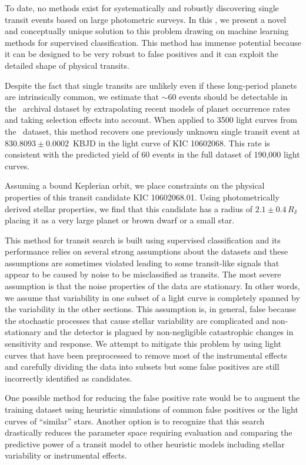 To date, no methods exist for systematically and robustly discovering single
transit events based on large photometric surveys.
In this \paper, we present a novel and conceptually unique solution to this
problem drawing on machine learning methods for supervised classification.
This method has immense potential because it can be designed to be very robust
to false positives and it can exploit the detailed shape of physical transits.

Despite the fact that single transits are unlikely even if these long-period
planets are intrinsically common, we estimate that $\sim 60$ events should be
detectable in the \kepler\ archival dataset by extrapolating recent models of
planet occurrence rates and taking selection effects into account.
When applied to 3500 light curves from the \kepler\ dataset, this method
recovers one previously unknown single transit event at
$830.8093\pm0.0002$~KBJD in the light curve of KIC 10602068.
This rate is consistent with the predicted yield of 60 events in the full
dataset of 190,000 light curves.

Assuming a bound Keplerian orbit, we place constraints on the physical
properties of this transit candidate KIC 10602068.01.
Using photometrically derived stellar properties, we find that this candidate
has a radius of $2.1 \pm 0.4\,R_\mathrm{J}$ placing it as a very large planet
or brown dwarf or a small star.

This method for transit search is built using supervised classification and
its performance relies on several strong assumptions about the datasets and
these assumptions are sometimes violated leading to some transit-like signals
that appear to be caused by noise to be misclassified as transits.
The most severe assumption is that the noise properties of the data are
stationary.
In other words, we assume that variability in one subset of a light curve is
completely spanned by the variability in the other sections.
This assumption is, in general, false because the stochastic processes that
cause stellar variability are complicated and non-stationary and the detector
is plagued by non-negligible catastrophic changes in sensitivity and response.
We attempt to mitigate this problem by using light curves that have been
preprocessed to remove most of the instrumental effects and carefully dividing
the data into subsets but some false positives are still incorrectly
identified as candidates.

One possible method for reducing the false positive rate would be to augment
the training dataset using heuristic simulations of common false positives or
the light curves of ``similar'' stars.
Another option is to recognize that this search drastically reduces the
parameter space requiring evaluation and comparing the predictive power of
a transit model to other heuristic models including stellar variability or
instrumental effects.
